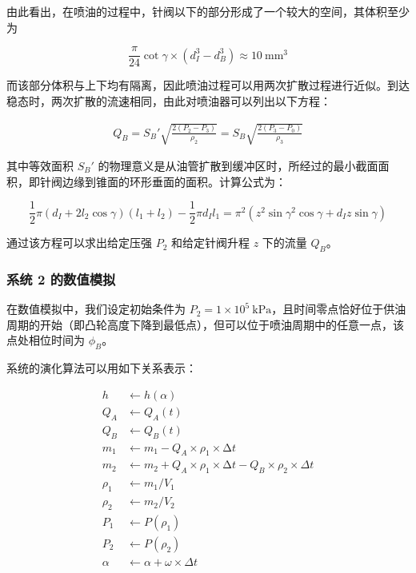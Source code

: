 \documentclass[withoutpreface,bwprint]{cumcmthesis}
\newcommand{\prb}{\times 10^5~\mathrm{kPa}}
\newcommand{\vol}{~\mathrm{mm^3}}
\begin{document}
由此看出，在喷油的过程中，针阀以下的部分形成了一个较大的空间，其体积至少为

$$
\frac{\pi}{24}\cot\gamma\times\left(d_I^3-d_B^3\right)\approx 10\vol
$$

而该部分体积与上下均有隔离，因此喷油过程可以用两次扩散过程进行近似。到达稳态时，两次扩散的流速相同，由此对喷油器可以列出以下方程：

$$
\begin{aligned}
Q_B=S_B'\sqrt{\frac{2(P_2-P_3)}{\rho_2}}=S_B\sqrt{\frac{2(P_3-P_0)}{\rho_3}}
\end{aligned}
$$

其中等效面积 $S_B'$ 的物理意义是从油管扩散到缓冲区时，所经过的最小截面面积，即针阀边缘到锥面的环形垂面的面积。计算公式为：

$$
\frac{1}{2}\pi{}(d_I+2l_2\cos{\gamma})(l_1+l_2)-\frac{1}{2}\pi d_Il_1 = \pi^2(z^2\sin{\gamma}^2\cos{\gamma}+d_Iz\sin{\gamma})
$$

通过该方程可以求出给定压强 $P_2$ 和给定针阀升程 $z$ 下的流量 $Q_B$。

\subsubsection{系统 2 的数值模拟}

在数值模拟中，我们设定初始条件为 $P_2=1\prb$，且时间零点恰好位于供油周期的开始（即凸轮高度下降到最低点），但可以位于喷油周期中的任意一点，该点处相位时间为 $\phi_B$。

系统的演化算法可以用如下关系表示：

$$
\begin{aligned}
	h &\leftarrow h(\alpha)\\
	Q_A &\leftarrow Q_A(t)\\
    Q_B &\leftarrow Q_B(t)\\
    m_1 &\leftarrow m_1 - Q_A \times \rho_1 \times \mathrm \Delta t\\
    m_2 &\leftarrow m_2 + Q_A \times \rho_1 \times \mathrm \Delta t - Q_B \times \rho_2 \times \Delta t\\
    \rho_1 &\leftarrow m_1 / V_1\\
    \rho_2 &\leftarrow m_2 / V_2\\
    P_1 &\leftarrow P(\rho_1)\\
    P_2 &\leftarrow P(\rho_2)\\
	\alpha &\leftarrow \alpha + \omega \times \Delta t\\
\end{aligned}
$$
\end{document}
